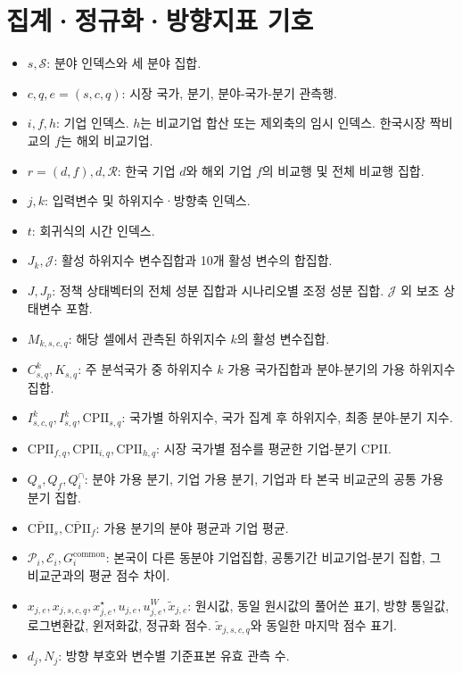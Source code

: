 \documentclass[11pt,a4paper]{report}
\begin{document}
\section{집계·정규화·방향지표 기호}
\begingroup
\footnotesize
\begin{itemize}[leftmargin=1.8em,itemsep=0.35em]
\item \(s,\mathcal S\): 분야 인덱스와 세 분야 집합.
\item \(c,q,e=(s,c,q)\): 시장 국가, 분기, 분야-국가-분기 관측행.
\item \(i,f,h\): 기업 인덱스. \(h\)는 비교기업 합산 또는 제외축의 임시 인덱스. 한국시장 짝비교의 \(f\)는 해외 비교기업.
\item \(r=(d,f),d,\mathcal R\): 한국 기업 \(d\)와 해외 기업 \(f\)의 비교행 및 전체 비교행 집합.
\item \(j,k\): 입력변수 및 하위지수·방향축 인덱스.
\item \(t\): 회귀식의 시간 인덱스.
\item \(J_k,\mathcal J\): 활성 하위지수 변수집합과 10개 활성 변수의 합집합.
\item \(J,J_p\): 정책 상태벡터의 전체 성분 집합과 시나리오별 조정 성분 집합. \(\mathcal J\) 외 보조 상태변수 포함.
\item \(M_{k,s,c,q}\): 해당 셀에서 관측된 하위지수 \(k\)의 활성 변수집합.
\item \(C^k_{s,q},K_{s,q}\): 주 분석국가 중 하위지수 \(k\) 가용 국가집합과 분야-분기의 가용 하위지수 집합.
\item \(I^k_{s,c,q},I^k_{s,q},\mathrm{CPII}_{s,q}\): 국가별 하위지수, 국가 집계 후 하위지수, 최종 분야-분기 지수.
\item \(\mathrm{CPII}_{f,q},\mathrm{CPII}_{i,q},\mathrm{CPII}_{h,q}\): 시장 국가별 점수를 평균한 기업-분기 CPII.
\item \(Q_s,Q_f,Q_i^\cap\): 분야 가용 분기, 기업 가용 분기, 기업과 타 본국 비교군의 공통 가용 분기 집합.
\item \(\bar{\mathrm{CPII}}_s,\bar{\mathrm{CPII}}_f\): 가용 분기의 분야 평균과 기업 평균.
\item \(\mathcal P_i,\mathcal E_i,G_i^{\mathrm{common}}\): 본국이 다른 동분야 기업집합, 공통기간 비교기업-분기 집합, 그 비교군과의 평균 점수 차이.
\item \(x_{j,e},x_{j,s,c,q},x^\star_{j,e},u_{j,e},u^W_{j,e},\tilde x_{j,e}\): 원시값, 동일 원시값의 풀어쓴 표기, 방향 통일값, 로그변환값, 윈저화값, 정규화 점수. \(\tilde x_{j,s,c,q}\)와 동일한 마지막 점수 표기.
\item \(d_j,N_j\): 방향 부호와 변수별 기준표본 유효 관측 수.

\end{itemize}
\end{document}
